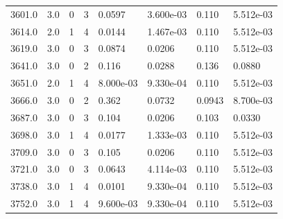 \documentclass[preview]{standalone}
\begin{document}
{{{{{{{{{\begin{tabular}{L{1.2cm}C{1.2cm} C{0.3cm}C{0.5cm} C{1.4cm}C{1.4cm} C{1.4cm}C{1.4cm}}
  3601.0  &   3.0  & 0     &  3 &  0.0597  & 3.600e-03  & 0.110 &  5.512e-03   \\ 
  3614.0  &   2.0  & 1     &  4 &  0.0144  & 1.467e-03  & 0.110 &  5.512e-03   \\ 
  3619.0  &   3.0  & 0     &  3 &  0.0874  & 0.0206  & 0.110 &  5.512e-03   \\ 
  3641.0  &   3.0  & 0     &  2 &  0.116  & 0.0288  & 0.136 &  0.0880   \\ 
  3651.0  &   2.0  & 1     &  4 &  8.000e-03  & 9.330e-04  & 0.110 &  5.512e-03   \\ 
  3666.0  &   3.0  & 0     &  2 &  0.362  & 0.0732  & 0.0943 &  8.700e-03   \\ 
  3687.0  &   3.0  & 0     &  3 &  0.104  & 0.0206  & 0.103 &  0.0330   \\ 
  3698.0  &   3.0  & 1     &  4 &  0.0177  & 1.333e-03  & 0.110 &  5.512e-03   \\ 
  3709.0  &   3.0  & 0     &  3 &  0.105  & 0.0206  & 0.110 &  5.512e-03   \\ 
  3721.0  &   3.0  & 0     &  3 &  0.0643  & 4.114e-03  & 0.110 &  5.512e-03   \\ 
  3738.0  &   3.0  & 1     &  4 &  0.0101  & 9.330e-04  & 0.110 &  5.512e-03   \\ 
  3752.0  &   3.0  & 1     &  4 &  9.600e-03  & 9.330e-04  & 0.110 &  5.512e-03   \\ 
\hline 
\end{tabular} 

}}}}}}}}}
\end{document}
